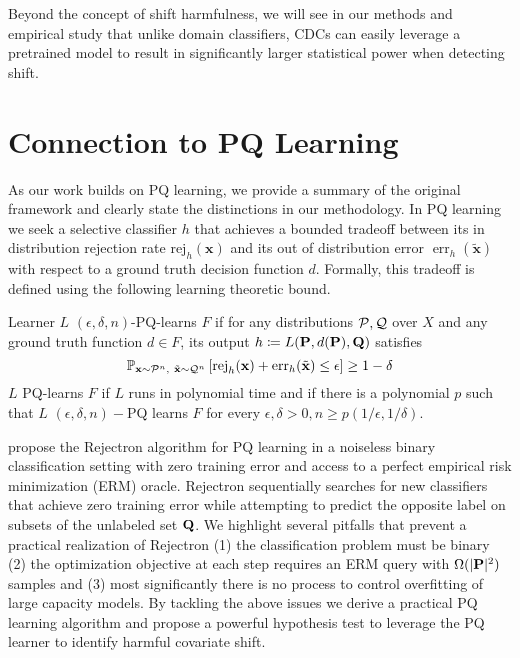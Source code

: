 Beyond the concept of shift harmfulness, we will see in our methods and empirical study that unlike domain classifiers, CDCs can easily leverage a pretrained model to result in significantly larger statistical power when detecting shift.


\section{Connection to PQ Learning}\label{sec:relationship-with-pq-learning}

As our work builds on PQ learning, we provide a summary of the original framework and clearly state the distinctions in our methodology.
In PQ learning we seek a selective classifier $h$ that achieves
a bounded tradeoff between its in distribution rejection rate $\text{rej}_h(\mathbf{x})$ and its out of distribution error $\operatorname{err}_h(\tilde{\mathbf{x}})$ with respect to a ground truth decision function $d$.
Formally, this tradeoff is defined using the following learning theoretic bound.

\begin{definition}
    Learner $L$ $(\epsilon, \delta, n)$-PQ-learns $F$ if for any distributions $\mathcal{P}, \mathcal{Q}$ over $X$ and any ground truth function $d \in F$, its output $h\coloneqq L(\mathbf{P}, d(\mathbf{P}), \mathbf{Q})$ satisfies
    \begin{equation}
        \mathbb{P}_{{\mathbf{x} \sim \Pc^{n}},\ {\tilde{\mathbf{x}} \sim \Qc^{n}}}\left[\text{rej}_h(\mathbf{x})+\operatorname{err}_h(\tilde{\mathbf{x}}) \leq \epsilon\right] \geq 1-\delta
        \label{eq:pqlearn}
    \end{equation}
    $L$ PQ-learns $F$ if $L$ runs in polynomial time and if there is a polynomial $p$ such that $L$ $(\epsilon, \delta, n)-$PQ learns $F$ for every $\epsilon, \delta>0, n \geq p(1 / \epsilon, 1 / \delta)$.
\end{definition}
\citeauthor{pqlearn} propose the Rejectron algorithm for PQ learning in a noiseless binary classification setting with zero training error and access to a perfect empirical risk minimization (ERM) oracle.
Rejectron sequentially searches for new classifiers that achieve zero training error while attempting to predict the opposite label on subsets of the unlabeled set $\mathbf{Q}$.
We highlight several pitfalls that prevent a practical realization of Rejectron (1) the classification problem must be binary (2) the optimization objective at each step requires an ERM query with $\Omega(|\mathbf{P}|^2)$ samples and (3) most significantly there is no process to control overfitting of large capacity models.
By tackling the above issues we derive a practical PQ learning algorithm and propose a powerful hypothesis test to leverage the PQ learner to identify harmful covariate shift.


